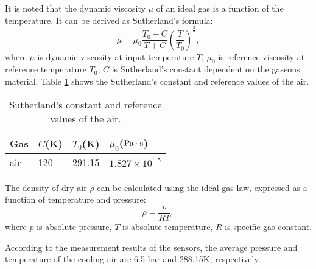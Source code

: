 It is noted that the dynamic viscosity $\mu$ of an ideal gas is a function of the temperature. It can be derived as Sutherland's formula:
\[\mu  = {\mu _0}\frac{{{T_0} + C}}{{T + C}}{\left( {\frac{T}{{{T_0}}}} \right)^{\frac{3}{2}}},\]
where $\mu$ is dynamic viscosity at input temperature $T$,
$\mu_0$ is reference viscosity at reference temperature $T_0$,
$C$ is Sutherland's constant dependent on the gaseous material.
Table \ref{tab:SutherlandConstant} shows the Sutherland's constant and reference values of the air.
\begin{table}[htbp]
  \centering
  \caption{Sutherland's constant and reference values of the air.}
    \begin{tabular}{p{2cm}p{2cm}p{2cm}p{3cm}}
    \toprule
    Gas   & $C$(K) & $T_0$(K) & $\mu_0$($\rm{Pa\cdot s}$) \\
    \midrule
    air   & 120   & 291.15 & $1.827\times 10^{-5}$ \\
    \bottomrule
    \end{tabular}%
  \label{tab:SutherlandConstant}%
\end{table}%

The density of dry air $\rho$ can be calculated using the ideal gas law, expressed as a function of temperature and pressure:
\begin{equation}
\rho  = \frac{p}{{RT}},
\label{Equ:AirDensity}
\end{equation}
where
$p$ is absolute pressure,
$T$ is absolute temperature,
$R$ is specific gas constant.

According to the measurement results of the sensors, the average pressure and temperature of the cooling air are 6.5 bar and 288.15K, respectively.

